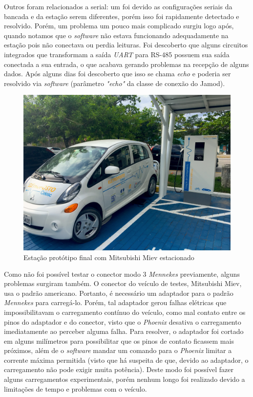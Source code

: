    Outros foram relacionados a serial: um foi devido as configurações seriais da bancada e da estação serem diferentes, porém isso foi rapidamente detectado e resolvido. Porém, um problema um pouco mais complicado surgiu logo após, quando notamos que o \textit{software} não estava funcionando adequadamente na estação pois não conectava ou perdia leituras. Foi descoberto que alguns circuitos integrados que transformam a saída \textit{\ac{UART}} para RS-485 possuem sua saída conectada a sua entrada, o que acabava gerando problemas na recepção de alguns dados. Após alguns dias foi descoberto que isso se chama \textit{echo} e poderia ser resolvido via \textit{software} (parâmetro \textit{"echo"} da classe de conexão do Jamod).

    \begin{figure}[H]
      \begin{center}
        \includegraphics[width=.75\textwidth,natwidth=4032,natheight=3024]{assets/images/evse.jpg}
        \caption{Estação protótipo final com Mitsubishi Miev estacionado}
        \label{fig:evse}
      \end{center}
    \end{figure}

    Como não foi possível testar o conector modo 3 \textit{Mennekes} previamente, alguns problemas surgiram também. O conector do veículo de testes, Mitsubishi Miev, usa o padrão americano. Portanto, é necessário um adaptador para o padrão \textit{Mennekes} para carregá-lo. Porém, tal adaptador gerou falhas elétricas que impossibilitavam o carregamento contínuo do veículo, como mal contato entre os pinos do adaptador e do conector, visto que o \textit{Phoenix} desativa o carregamento imediatamente ao perceber alguma falha. Para resolver, o adaptador foi cortado em alguns milímetros para possibilitar que os pinos de contato ficassem mais próximos, além de o \textit{software} mandar um comando para o \textit{Phoenix} limitar a corrente máxima permitida (visto que há suspeita de que, devido ao adaptador, o carregamento não pode exigir muita potência). Deste modo foi possível fazer alguns carregamentos experimentais, porém nenhum longo foi realizado devido a limitações de tempo e problemas com o veículo.

